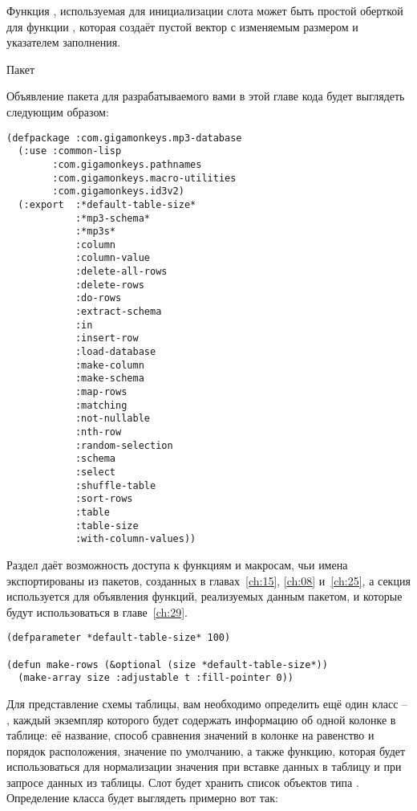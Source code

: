 Функция , используемая для инициализации слота  может быть
простой оберткой для функции , которая создаёт пустой вектор с изменяемым
размером и указателем заполнения.

Пакет

Объявление пакета для разрабатываемого вами в этой главе кода будет выглядеть следующим образом:

\begin{lstlisting}
(defpackage :com.gigamonkeys.mp3-database
  (:use :common-lisp 
        :com.gigamonkeys.pathnames
        :com.gigamonkeys.macro-utilities
        :com.gigamonkeys.id3v2)
  (:export  :*default-table-size*
            :*mp3-schema*
            :*mp3s*
            :column
            :column-value
            :delete-all-rows
            :delete-rows
            :do-rows
            :extract-schema
            :in
            :insert-row
            :load-database
            :make-column
            :make-schema
            :map-rows
            :matching
            :not-nullable
            :nth-row
            :random-selection
            :schema
            :select
            :shuffle-table
            :sort-rows
            :table
            :table-size
            :with-column-values))
\end{lstlisting}

Раздел  даёт возможность доступа к функциям и макросам, чьи имена
экспортированы из пакетов, созданных в главах~\ref{ch:15}, \ref{ch:08} и~\ref{ch:25}, а
секция  используется для объявления функций, реализуемых данным пакетом, и
которые будут использоваться в главе~\ref{ch:29}.


\begin{lstlisting}
(defparameter *default-table-size* 100)

(defun make-rows (&optional (size *default-table-size*))
  (make-array size :adjustable t :fill-pointer 0))
\end{lstlisting}

Для представление схемы таблицы, вам необходимо определить ещё один класс --
, каждый экземпляр которого будет содержать информацию об одной колонке в
таблице: её название, способ сравнения значений в колонке на равенство и порядок
расположения, значение по умолчанию, а также функцию, которая будет использоваться для
нормализации значения при вставке данных в таблицу и при запросе данных из таблицы. Слот
 будет хранить список объектов типа .  Определение класса будет
выглядеть примерно вот так:

